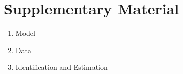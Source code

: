 





\section{Supplementary Material}

\begin{enumerate}
    \item Model
    \item Data
    \item Identification and Estimation
\end{enumerate}